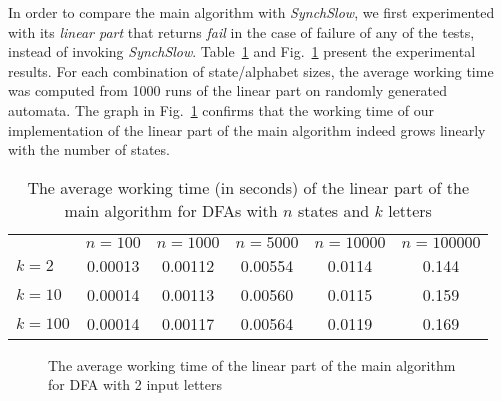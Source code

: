 \documentclass{jalc}
\begin{document}
In order to compare the main algorithm with \emph{SynchSlow}, we first experimented with its \emph{linear part} that returns \emph{fail} in the case of failure of any of the tests, instead of invoking \emph{SynchSlow}. Table~\ref{tab:avgtime} and Fig.~\ref{fig:avgtime} present the experimental results. For each combination of state/alphabet sizes, the average working time was computed from 1000 runs of the linear part on randomly generated automata. The graph in Fig.~\ref{fig:avgtime} confirms that the working time of our implementation of the linear part of the main algorithm indeed grows linearly with the number of states.
\begin{table}
\caption{The average working time (in seconds) of the linear part of the main algorithm for DFAs with $n$ states and $k$ letters}
\centering
\setlength\tabcolsep{3pt}
\begin{tabular}{l|c|c|c|c|c}
\hline\noalign{\smallskip}
&\quad $n=100$ \quad & \quad $n=1000$\quad  &\quad  $n=5000$\quad  &\quad  $n=10000$ \quad & \quad $n=100000$\\
\noalign{\smallskip}
\hline
\noalign{\smallskip}
  $k=2$ & 0.00013 & 0.00112 & 0.00554 & 0.0114 & 0.144\\
 $k=10$ & 0.00014 & 0.00113 & 0.00560 & 0.0115 & 0.159\\
$k=100$ \quad & 0.00014 & 0.00117 & 0.00564 & 0.0119 & 0.169\\
\hline
\end{tabular}
\label{tab:avgtime}
\end{table}

\begin{figure}[h]
\centering
{}
\caption{The average working time of the linear part of the main algorithm for DFA with 2 input letters}
\label{fig:avgtime}
\end{figure}
\end{document}
